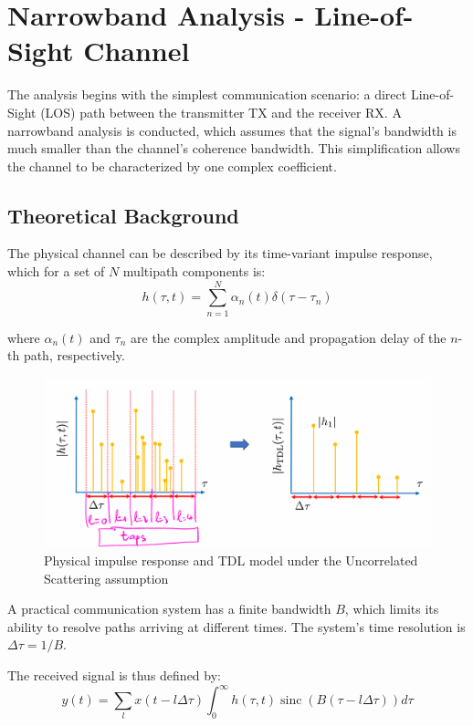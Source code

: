 \chapter{Narrowband Analysis - Line-of-Sight Channel}
\label{chap:los}

The analysis begins with the simplest communication scenario: a direct Line-of-Sight (LOS) path between the transmitter TX and the receiver RX. A narrowband analysis is conducted, which assumes that the signal's bandwidth is much smaller than the channel's coherence bandwidth. This simplification allows the channel to be characterized by one complex coefficient.

\section{Theoretical Background}
The physical channel can be described by its time-variant impulse response, which for a set of $N$ multipath components is:
\begin{equation}
	h(\tau,t) = \sum_{n=1}^{N} \alpha_n(t) \delta(\tau - \tau_n)
\end{equation}

where $\alpha_n(t)$ and $\tau_n$ are the complex amplitude and propagation delay of the $n$-th path, respectively.

\begin{figure}[H]
	\centering
	\includegraphics[width=\linewidth]{content/4-images/taps}
	\caption{Physical impulse response and TDL model under the Uncorrelated Scattering assumption}
	\label{fig:taps}
\end{figure}

A practical communication system has a finite bandwidth $B$, which limits its ability to resolve paths arriving at different times. The system's time resolution is $\Delta\tau = 1/B$. 

The received signal is thus defined by:
\begin{equation}
	y(t) = \sum_l x(t-l \Delta \tau) \int_0^{\infty} h(\tau, t) \operatorname{sinc}(B(\tau-l \Delta \tau)) d \tau
\end{equation}

